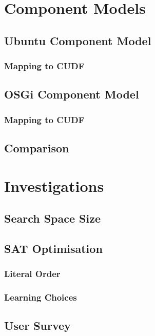 \documentclass{report}
\begin{document}
\chapter{Component Models}
\section{Ubuntu Component Model}
\subsection{Mapping to CUDF}

\section{OSGi Component Model}
\subsection{Mapping to CUDF}

\section{Comparison}

\chapter{Investigations}

\section{Search Space Size}

\section{SAT Optimisation}
\subsection{Literal Order}
\subsection{Learning Choices}



\section{User Survey}
\end{document}
